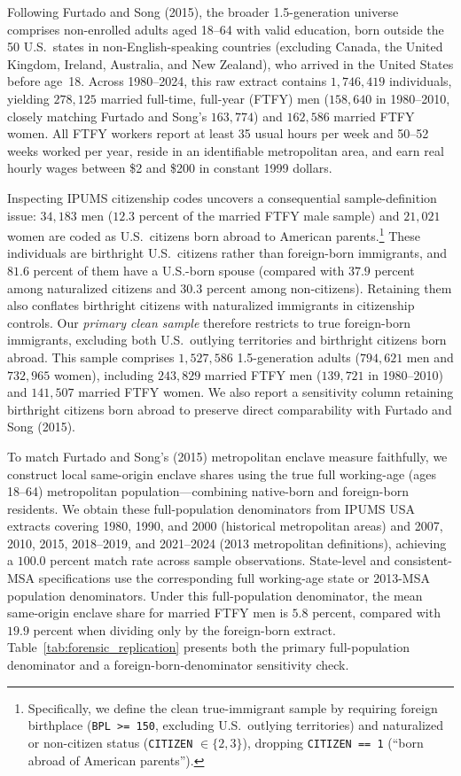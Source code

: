 \documentclass[11pt]{article}
\begin{document}
Following Furtado and Song (2015), the broader 1.5-generation universe comprises non-enrolled adults aged 18--64 with valid education, born outside the 50 U.S.\ states in non-English-speaking countries (excluding Canada, the United Kingdom, Ireland, Australia, and New Zealand), who arrived in the United States before age~18. Across 1980--2024, this raw extract contains $1{,}746{,}419$ individuals, yielding $278{,}125$ married full-time, full-year (FTFY) men ($158{,}640$ in 1980--2010, closely matching Furtado and Song's $163{,}774$) and $162{,}586$ married FTFY women. All FTFY workers report at least 35 usual hours per week and 50--52 weeks worked per year, reside in an identifiable metropolitan area, and earn real hourly wages between \$2 and \$200 in constant 1999 dollars.

Inspecting IPUMS citizenship codes uncovers a consequential sample-definition issue: $34{,}183$ men ($12.3$ percent of the married FTFY male sample) and $21{,}021$ women are coded as U.S.\ citizens born abroad to American parents.\footnote{Specifically, we define the clean true-immigrant sample by requiring foreign birthplace (\texttt{BPL >= 150}, excluding U.S.\ outlying territories) and naturalized or non-citizen status (\texttt{CITIZEN} $\in \{2, 3\}$), dropping \texttt{CITIZEN == 1} (``born abroad of American parents'').} These individuals are birthright U.S.\ citizens rather than foreign-born immigrants, and $81.6$ percent of them have a U.S.-born spouse (compared with $37.9$ percent among naturalized citizens and $30.3$ percent among non-citizens). Retaining them also conflates birthright citizens with naturalized immigrants in citizenship controls. Our \emph{primary clean sample} therefore restricts to true foreign-born immigrants, excluding both U.S.\ outlying territories and birthright citizens born abroad. This sample comprises $1{,}527{,}586$ 1.5-generation adults ($794{,}621$ men and $732{,}965$ women), including $243{,}829$ married FTFY men ($139{,}721$ in 1980--2010) and $141{,}507$ married FTFY women. We also report a sensitivity column retaining birthright citizens born abroad to preserve direct comparability with Furtado and Song (2015).

To match Furtado and Song's (2015) metropolitan enclave measure faithfully, we construct local same-origin enclave shares using the true full working-age (ages 18--64) metropolitan population---combining native-born and foreign-born residents. We obtain these full-population denominators from IPUMS USA extracts covering 1980, 1990, and 2000 (historical metropolitan areas) and 2007, 2010, 2015, 2018--2019, and 2021--2024 (2013 metropolitan definitions), achieving a $100.0$ percent match rate across sample observations. State-level and consistent-MSA specifications use the corresponding full working-age state or 2013-MSA population denominators. Under this full-population denominator, the mean same-origin enclave share for married FTFY men is $5.8$ percent, compared with $19.9$ percent when dividing only by the foreign-born extract. Table~\ref{tab:forensic_replication} presents both the primary full-population denominator and a foreign-born-denominator sensitivity check.
\end{document}
